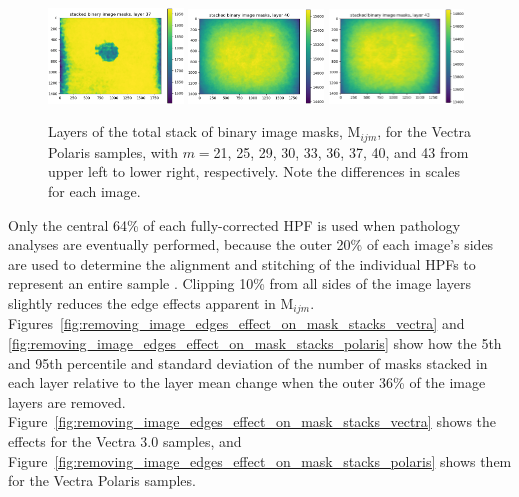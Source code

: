 \documentclass[letterpaper,11pt]{article}
\newcommand{\reffig}[1]{Figure~\ref{#1}}
\newcommand{\Mu}{\mathrm{M}}
\begin{document}
\begin{figure}[!ht]
\includegraphics[width=0.32\textwidth]{images/measuring_flatfield_corrections/mask_stack_layers_polaris/mask_stack_layer_37}
\includegraphics[width=0.32\textwidth]{images/measuring_flatfield_corrections/mask_stack_layers_polaris/mask_stack_layer_40}
\includegraphics[width=0.32\textwidth]{images/measuring_flatfield_corrections/mask_stack_layers_polaris/mask_stack_layer_43}
\caption{\footnotesize Layers of the total stack of binary image masks, $\Mu_{ijm}$, for the Vectra Polaris samples, with $m=$21, 25, 29, 30, 33, 36, 37, 40, and 43 from upper left to lower right, respectively. Note the differences in scales for each image.}
\label{fig:mask_stack_layers_polaris_2}
\end{figure}

Only the central 64\% of each fully-corrected HPF is used when pathology analyses are eventually performed, because the outer 20\% of each image's sides are used to determine the alignment and stitching of the individual HPFs to represent an entire sample \cite{Heshy}. Clipping 10\% from all sides of the image layers slightly reduces the edge effects apparent in $\Mu_{ijm}$. Figures~\ref{fig:removing_image_edges_effect_on_mask_stacks_vectra} and \ref{fig:removing_image_edges_effect_on_mask_stacks_polaris} show how the 5th and 95th percentile and standard deviation of the number of masks stacked in each layer relative to the layer mean change when the outer 36\% of the image layers are removed. \reffig{fig:removing_image_edges_effect_on_mask_stacks_vectra} shows the effects for the Vectra 3.0 samples, and \reffig{fig:removing_image_edges_effect_on_mask_stacks_polaris} shows them for the Vectra Polaris samples.
\end{document}
